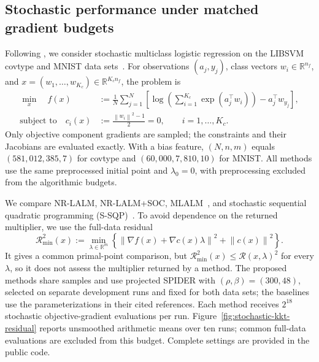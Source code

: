 \documentclass[11pt]{article}
\theoremstyle{definition}
\theoremstyle{remark}
\numberwithin{equation}{section}
\numberwithin{figure}{section}
\numberwithin{table}{section}
\numberwithin{algorithm}{section}
\newcommand{\R}{\mathbb{R}}
\newcommand{\norm}[1]{\left\lVert #1\right\rVert}
\newcommand{\grad}{\nabla}
\begin{document}
\subsection{Stochastic performance under matched gradient budgets}
\label{subsec:stochastic-comparison}

Following \cite{BerahasBollapragadaGupta2025}, we consider stochastic multiclass logistic regression on the LIBSVM covtype and MNIST data sets~\cite{ChangLin2011}. For observations \((a_j,y_j)\), class vectors \(w_i\in\R^{n_f}\), and
\(x=(w_1,\ldots,w_{K_c})\in\R^{K_c n_f}\), the problem is
\begin{equation}
\begin{aligned}
 \min_x\quad
 f(x)&:=\frac1N\sum_{j=1}^N
 \left[\log\!\left(\sum_{i=1}^{K_c}\exp(a_j^\top w_i)\right)
       -a_j^\top w_{y_j}\right],\\
 \text{subject to}\quad
 c_i(x)&:=\frac{\norm{w_i}^2-1}{2}=0,
 \qquad i=1,\ldots,K_c.
\end{aligned}
 \label{eq:stochastic-multiclass-sphere}
\end{equation}
Only objective component gradients are sampled; the constraints and their Jacobians are evaluated exactly.  With a bias feature, \((N,n,m)\) equals
\((581{,}012,385,7)\) for covtype and \((60{,}000,7{,}810,10)\) for MNIST.
All methods use the same preprocessed initial point and \(\lambda_0=0\), with
preprocessing excluded from the algorithmic budgets.

We compare NR-LALM, NR-LALM+SOC, MLALM~\cite{ShiWangWang2025}, and stochastic
sequential quadratic programming (S-SQP)~\cite{BerahasEtAl2021}.  To avoid
dependence on the returned multiplier, we use the full-data residual
$$
\mathcal R_{\min}^2(x)
:=\min_{\lambda\in\R^m}
\left\{\norm{\grad f(x)+\grad c(x)\lambda}^2+\norm{c(x)}^2\right\}.
$$
It gives a common primal-point comparison, but
\(\mathcal R_{\min}^2(x)\le\mathcal R(x,\lambda)^2\) for every \(\lambda\), so
it does not assess the multiplier returned by a method. The proposed methods share samples and use projected SPIDER with
\((\rho,\beta)=(300,48)\), selected on separate development runs and fixed for
both data sets; the baselines use the parameterizations in their cited
references.  Each method receives \(2^{18}\) stochastic objective-gradient
evaluations per run.  Figure~\ref{fig:stochastic-kkt-residual} reports
unsmoothed arithmetic means over ten runs; common full-data evaluations are
excluded from this budget.  Complete settings are provided in the public code.
\end{document}

